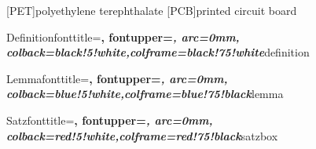 
\usepackage{cite}
\usepackage{appendix}
\usepackage{xcolor}
\usepackage{graphicx}
\usepackage{lmodern}
\usepackage{framed}
\usepackage[chapter]{algorithm}
\usepackage{verbatim}
\usepackage[english]{babel} %
\usepackage{hyperref}
\usepackage{amsmath}
\usepackage{amsfonts}
\usepackage{amssymb}
\usepackage{a4wide}
\usepackage[headsepline,footsepline]{scrlayer-scrpage}
\usepackage{microtype}
\usepackage{float}
\usepackage[utf8]{inputenc}
\usepackage{stringstrings}
\usepackage{amsthm}
\usepackage[most]{tcolorbox}
\usepackage{prettyref}
\usepackage[margin=2.5cm, includefoot]{geometry}
\usepackage{wrapfig}
\usepackage[nolist]{acronym}

\begin{acronym}
    [PET]{polyethylene terephthalate}
    [PCB]{printed circuit board}
\end{acronym}

%
{Definition}{fonttitle=\bfseries\upshape, fontupper=\slshape,
    arc=0mm, colback=black!5!white,colframe=black!75!white}{definition}

%
{Lemma}{fonttitle=\bfseries\upshape, fontupper=\slshape,
    arc=0mm, colback=blue!5!white,colframe=blue!75!black}{lemma}

%
{Satz}{fonttitle=\bfseries\upshape, fontupper=\slshape,
    arc=0mm, colback=red!5!white,colframe=red!75!black}{satzbox}





